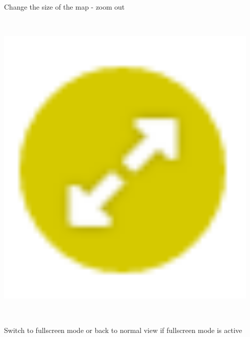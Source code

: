 \label{fig:controll_button_minus}
~
\begin{minipage}{0.94\textwidth}
	Change the size of the map - zoom out\\
\end{minipage}
~
\begin{minipage}{0.05\textwidth}
	\includegraphics[width=0.95\textwidth]{graphics/resize.png}
\end{minipage}
\label{fig:controll_button_resize}
~
\begin{minipage}{0.94\textwidth}
	Switch to fullscreen mode or back to normal view if fullscreen mode is active\\
\end{minipage}
~
